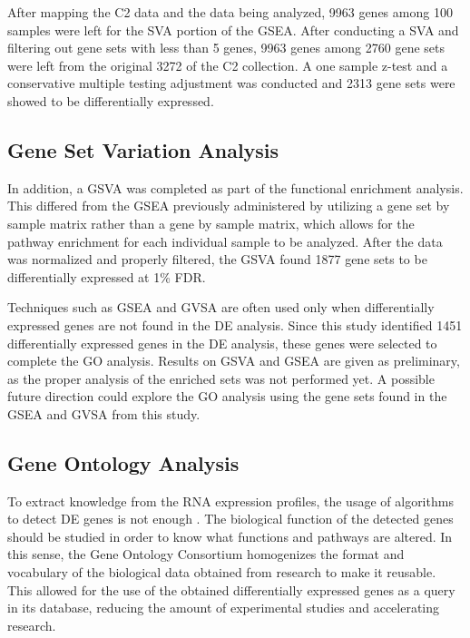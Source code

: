 \documentclass[9pt,twocolumn,twoside]{gsajnl}
\begin{document}
After mapping the C2 data and the data being analyzed, 9963 genes among 100 samples were left for the SVA portion of the GSEA. After conducting a SVA and filtering out gene sets with less than 5 genes, 9963 genes among 2760 gene sets were left from the original 3272 of the C2 collection. A one sample z-test and a conservative multiple testing adjustment was conducted and 2313 gene sets were showed to be differentially expressed.

\subsection{Gene Set Variation Analysis}

In addition, a GSVA was completed as part of the functional enrichment analysis. This differed from the GSEA previously administered by utilizing a gene set by sample matrix rather than a gene by sample matrix, which allows for the pathway enrichment for each individual sample to be analyzed. After the data was normalized and properly filtered, the GSVA found 1877 gene sets to be differentially expressed at 1\% FDR. 

Techniques such as GSEA and GVSA are often used only when differentially expressed genes are not found in the DE analysis. Since this study identified 1451 differentially expressed genes in the DE analysis, these genes were selected to complete the GO analysis. Results on GSVA and GSEA are given as preliminary, as the proper analysis of the enriched sets was not performed yet. A possible future direction could explore the GO analysis using the gene sets found in the GSEA and GVSA from this study.

\subsection{Gene Ontology Analysis}

To extract knowledge from the RNA expression profiles, the usage of algorithms to detect DE genes is not enough \citep{dudoit2002statistical}. The biological function of the detected genes should be studied in order to know what functions and pathways are altered. In this sense, the Gene Ontology Consortium  homogenizes the format and vocabulary of the biological data obtained from research to make it reusable\citep{GO}. This allowed for the use of the obtained differentially expressed genes as a query in its database, reducing the amount of experimental studies and accelerating research.
\end{document}
